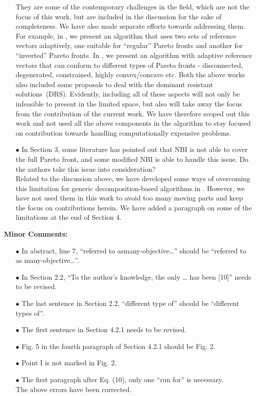 \documentclass[onecolumn,10pt]{asme2ej}
\begin{document}
\begin{itemize}
{\color{blue}
They are some of the contemporary challenges in the field, which are not the focus of this work, but are included in the discussion for the sake of completeness. We have also made separate efforts towards addressing them. For example, in \cite{KHTjmd2017}, we present an algorithm that uses two sets of reference vectors adaptively, one suitable for ``regular'' Pareto fronts and another for ``inverted'' Pareto fronts. In \cite{asaf2017enhanced}, we present an algorithm with adaptive reference vectors that can conform to different types of Pareto fronts - disconnected, degenerated, constrained, highly convex/concave etc. Both the above works also included some proposals to deal with the dominant resistant solutions~(DRS). Evidently, including all of these aspects will not only be infeasible to present in the limited space, but also will take away the focus from the contribution of the current work. We have therefore scoped out this work and not used all the above components in the algorithm to stay focused on contribution towards handling computationally expensive problems. }\\

\item[$\bullet$]	In Section 3, some literature has pointed out that NBI is not able to cover the full Pareto front, and some modified NBI is able to handle this issue. Do the authors take this issue into consideration?\\


{\color{blue} Related to the discussion above, we have developed some ways of overcoming this limitation for generic decomposition-based algorithms in \cite{asaf2017enhanced,KHTjmd2017}. However, we have not used them in this work to avoid too many moving parts and keep the focus on contributions herein. We have added a paragraph on some of the limitations at the end of Section 4.
} \\
\end{itemize}

\textbf{Minor Comments:}
\begin{itemize}
\item[$\bullet$]	In abstract, line 7, “referred to asmany-objective…” should be “referred to as many-objective…”.
\item[$\bullet$]	In Section 2.2, “To the author’s knowledge, the only … has been [10]” needs  to be revised.
\item[$\bullet$]	The last sentence in Section 2.2, “different type of” should be “different types of”.
\item[$\bullet$]	The first sentence in Section 4.2.1 needs to be revised.
\item[$\bullet$]  Fig. 5 in the fourth paragraph of Section 4.2.1 should be Fig. 2.
\item[$\bullet$]	Point I is not marked in Fig. 2.
\item[$\bullet$]	The first paragraph after Eq. (10), only one “run for” is necessary.\\ 

{\color{blue}The above errors have been corrected. 
}
\end{itemize}





\end{document}

